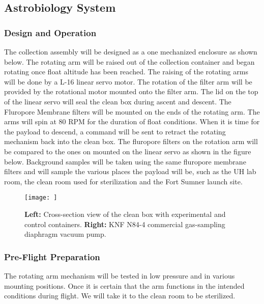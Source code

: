 \subsection{Astrobiology System}
\label{sec:AstrobiologySystem}

\subsubsection{Design and Operation}
The collection assembly will be designed as a one mechanized enclosure as shown below. The rotating arm will be raised out of the collection container and began rotating once float altitude has been reached. The raising of the rotating arms will be done by a L-16 linear servo motor. The rotation of the filter arm will be provided by the rotational motor mounted onto the filter arm. The lid on the top of the linear servo will seal the clean box during ascent and descent. The  Fluropore Membrane filters will be mounted on the ends of the rotating arm. The arms will spin at 80 RPM for the duration of float conditions. When it is time for the payload to descend, a command will be sent to retract the rotating mechanism back into the clean box. The fluropore filters on the rotation arm will be compared to the ones on mounted on the linear servo as shown in the figure below. Background samples will be taken using the same fluropore membrane filters and will sample the various places the payload will be, such as the UH lab room, the clean room used for sterilization and the Fort Sumner launch site. 

\begin{figure}[!h] 
	\begin{center}
		\texttt{[image: ]}
		\caption{{\bf Left:} Cross-section view of the clean box with experimental and control containers. {\bf Right:} KNF N84-4 commercial gas-sampling diaphragm vacuum pump. }
		\label{fig:Pump}
	\end{center}
\end{figure} 
\subsubsection{Pre-Flight Preparation}
The rotating arm mechanism will be tested in low pressure and in various mounting positions. Once it is certain that the arm functions in the intended conditions during flight. We will take it to the clean room to be sterilized.  

